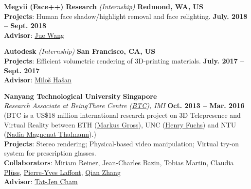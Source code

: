 \documentclass[margin,line]{resume}
\begin{document}
\begin{resume}
    \vspace{0.0mm}

	\textbf{Megvii (Face++) Research} \textsl{(Internship)} \hfill \textbf{Redmond, WA, US} \\
	\textbf{Projects}: Human face shadow/highlight removal and face relighting.  \hfill \textbf{July. 2018 -- Sept. 2018}\\
	\textbf{Advisor}: \href{https://www.juew.org/}{Jue Wang}        

    \vspace{0.0mm}

    \textbf{Autodesk}  \textsl{(Internship)} \hfill \textbf{San Francisco, CA, US} \\
    \textbf{Projects}: Efficient volumetric rendering of 3D-printing materials. \hfill \textbf{July. 2017 -- Sept. 2017}\\
    \textbf{Advisor}: \href{http://miloshasan.net/}{Milo\v{s} Ha\v{s}an}       
    
    \vspace{0.0mm}
    
    \textbf{Nanyang Technological University} \hfill \textbf{Singapore} \\
    \textsl{Research Associate at BeingThere Centre (\href{https://www.youtube.com/watch?v=Oy-xrxOB_4Q}{BTC}), IMI} \hfill \textbf{Oct. 2013 -- Mar. 2016}\\
    (BTC is a US\$18 million international research project on 3D Telepresence and Virtual Reality between ETH (\href{https://en.wikipedia.org/wiki/Markus_Gross}{Markus Gross}), UNC (\href{https://en.wikipedia.org/wiki/Henry_Fuchs}{Henry Fuchs}) and
    NTU (\href{https://en.wikipedia.org/wiki/Nadia_Magnenat_Thalmann}{Nadia Magnenat Thalmann}).)\\
    \textbf{Projects}: Stereo rendering; Physical-based video manipulation; Virtual try-on system for prescription glasses. \\
    \textbf{Collaborators}: \href{http://vrneurocog.wixsite.com/vrneurocog}{Miriam Reiner},
    \href{https://scholar.google.com/citations?user=XPZLx-8AAAAJ&hl=en}{Jean-Charles Bazin},
    \href{https://www.virtamed.com/en/about-us/team/tobias-martin-phd/}{Tobias Martin},
    \href{https://www.crunchbase.com/person/claudia-pluss}{Claudia Pl\"{u}ss},
    \href{http://www.py-laffont.info/}{Pierre-Yves Laffont},
    \href{https://qianzhanginfo.github.io/}{Qian Zhang} \\
    \textbf{Advisor}: \href{http://www.ntu.edu.sg/home/astjcham/}{Tat-Jen Cham} 


\end{resume}
\end{document}
